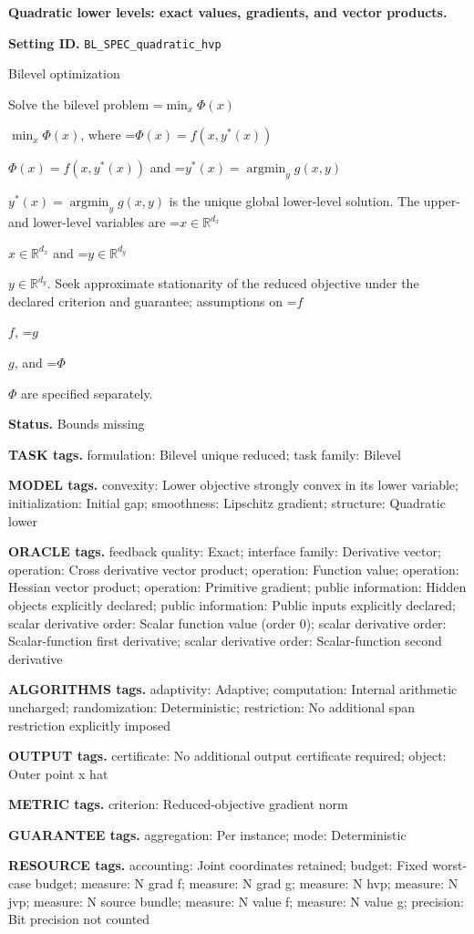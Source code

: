 \documentclass[10pt,a4paper]{article}
\newcommand{\AtlasMath}[1]{\par\begingroup\centering\setbox0=\hbox{$\displaystyle #1$}\ifdim\wd0>1.4\linewidth\typeout{ATLAS WIDE FORMULA: \the\wd0}\fi\ifdim\wd0>\linewidth\resizebox{\linewidth}{!}{\box0}\else\box0\fi\par\endgroup}
\newcommand{\AtlasInlineMath}[1]{\begingroup\setbox0=\hbox{$#1$}\ifdim\wd0>.4\linewidth\endgroup\AtlasMath{#1}\else\endgroup$#1$\fi}
\begin{document}
\raggedright

{\LARGE\bfseries\sffamily\color{AtlasNavy} Quadratic lower levels: exact values, gradients, and vector products.\par}\vspace{5pt}
\textbf{Setting ID.} \texttt{BL\_\allowbreak{}SPEC\_\allowbreak{}quadratic\_\allowbreak{}hvp}

Bilevel optimization

Solve the bilevel problem \AtlasInlineMath{\min_x\Phi(x)}, where \AtlasInlineMath{\Phi(x)=f(x,y^*(x))} and \AtlasInlineMath{y^*(x)=\operatorname*{argmin}_y g(x,y)} is the unique global lower-level solution. The upper- and lower-level variables are \AtlasInlineMath{x\in\mathbb{R}^{d_x}} and \AtlasInlineMath{y\in\mathbb{R}^{d_y}}. Seek approximate stationarity of the reduced objective under the declared criterion and guarantee; assumptions on \AtlasInlineMath{f}, \AtlasInlineMath{g}, and \AtlasInlineMath{\Phi} are specified separately.

\textbf{Status.} Bounds missing

\textbf{TASK tags.} formulation: Bilevel unique reduced; task family: Bilevel

\textbf{MODEL tags.} convexity: Lower objective strongly convex in its lower variable; initialization: Initial gap; smoothness: Lipschitz gradient; structure: Quadratic lower

\textbf{ORACLE tags.} feedback quality: Exact; interface family: Derivative vector; operation: Cross derivative vector product; operation: Function value; operation: Hessian vector product; operation: Primitive gradient; public information: Hidden objects explicitly declared; public information: Public inputs explicitly declared; scalar derivative order: Scalar function value (order 0); scalar derivative order: Scalar-function first derivative; scalar derivative order: Scalar-function second derivative

\textbf{ALGORITHMS tags.} adaptivity: Adaptive; computation: Internal arithmetic uncharged; randomization: Deterministic; restriction: No additional span restriction explicitly imposed

\textbf{OUTPUT tags.} certificate: No additional output certificate required; object: Outer point x hat

\textbf{METRIC tags.} criterion: Reduced-objective gradient norm

\textbf{GUARANTEE tags.} aggregation: Per instance; mode: Deterministic

\textbf{RESOURCE tags.} accounting: Joint coordinates retained; budget: Fixed worst-case budget; measure: N grad f; measure: N grad g; measure: N hvp; measure: N jvp; measure: N source bundle; measure: N value f; measure: N value g; precision: Bit precision not counted
\end{document}
